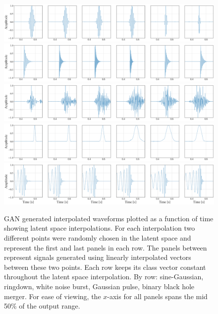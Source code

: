 \documentclass[12pt]{iopart}
\begin{document}
\begin{figure}[!h]
    \centering
    \includegraphics[width=\textwidth]{figures/generations/z_interp_sg.png}
    \includegraphics[width=\textwidth]{figures/generations/z_interp_rd.png}
    \includegraphics[width=\textwidth]{figures/generations/z_interp_wnb.png}
    \includegraphics[width=\textwidth]{figures/generations/z_interp_blip.png}
    \includegraphics[width=\textwidth]{figures/generations/z_interp_bbh.png}
    \caption{\ac{GAN} generated interpolated waveforms plotted as a function of time showing latent space interpolations. For each interpolation two different points were randomly chosen in the latent space and represent the first and last panels in each row. The panels between represent signals generated using linearly interpolated vectors between these two points. Each row keeps its class vector constant throughout the latent space interpolation. By row: sine-Gaussian, ringdown, white noise burst, Gaussian pulse, binary black hole merger. For ease of viewing, the $x$-axis for all panels spans the mid 50\% of the output range.}
    \label{fig:z_interp}
\end{figure}
\end{document}
